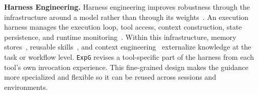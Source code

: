 \documentclass[11pt]{article}
\newcommand{\ours}{\texttt{ExpG}}
\begin{document}


\noindent
\textbf{Harness Engineering.} 
Harness engineering improves robustness through the infrastructure around a model rather than through its weights~\cite{18,19,1h,2h}. An execution harness manages the execution loop, tool access, context construction, state persistence, and runtime monitoring~\cite{3h,4h}. Within this infrastructure, memory stores~\cite{memsurvey, chhikara2025mem0}, reusable skills~\cite{1s, 2s}, and context engineering~\cite{c1, c2} externalize knowledge at the task or workflow level. {\ours} revises a tool-specific part of the harness from each tool's own invocation experience. This fine-grained design makes the guidance more specialized and flexible so it can be reused across sessions and environments.
\end{document}
